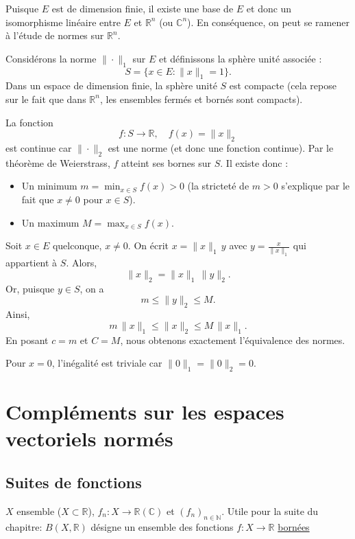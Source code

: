 \documentclass[a4paper]{report}
\newcommand\N{\ensuremath{\mathbb{N}}}
\newcommand\R{\ensuremath{\mathbb{R}}}
\theoremstyle{definition}
\begin{document}
\begin{preuve}

   Puisque \( E \) est de dimension finie, il existe une base de \( E \) et donc un isomorphisme linéaire entre \( E \) et \(\mathbb{R}^n\) (ou \(\mathbb{C}^n\)). En conséquence, on peut se ramener à l'étude de normes sur \(\mathbb{R}^n\).


   Considérons la norme \(\|\cdot\|_1\) sur \( E \) et définissons la sphère unité associée :
   \[
   S = \{ x \in E : \|x\|_1 = 1 \}.
   \]
   Dans un espace de dimension finie, la sphère unité \( S \) est compacte (cela repose sur le fait que dans \(\mathbb{R}^n\), les ensembles fermés et bornés sont compacts).


   La fonction
   \[
   f : S \to \mathbb{R}, \quad f(x) = \|x\|_2
   \]
   est continue car \(\|\cdot\|_2\) est une norme (et donc une fonction continue). Par le théorème de Weierstrass, \( f \) atteint ses bornes sur \( S \). Il existe donc :
   \begin{itemize}
       \item Un minimum \( m = \min_{x \in S} f(x) > 0 \) (la stricteté de \( m > 0 \) s’explique par le fait que \( x \neq 0 \) pour \( x \in S \)).
       \item Un maximum \( M = \max_{x \in S} f(x) \).
   \end{itemize}


   Soit \( x \in E \) quelconque, \( x \neq 0 \). On écrit \( x = \|x\|_1 \, y \) avec \( y = \frac{x}{\|x\|_1} \) qui appartient à \( S \). Alors,
   \[
   \|x\|_2 = \|x\|_1\,\|y\|_2.
   \]
   Or, puisque \( y \in S \), on a
   \[
   m \le \|y\|_2 \le M.
   \]
   Ainsi,
   \[
   m\,\|x\|_1 \le \|x\|_2 \le M\,\|x\|_1.
   \]
   En posant \( c = m \) et \( C = M \), nous obtenons exactement l'équivalence des normes.


   Pour \( x = 0 \), l'inégalité est triviale car \( \|0\|_1 = \|0\|_2 = 0 \).


\end{preuve}
\section{Compléments sur les espaces vectoriels normés}
\subsection{Suites de fonctions}
$X$ ensemble ($X \subset \R$), $f_n: X \to \R(\mathbb{C})$ et $(f_n)_{n \in \N}$. Utile pour la suite du chapitre: $B(X, \R)$ désigne un ensemble des fonctions $f: X \to \R$ \underline{bornées}
\end{document}
